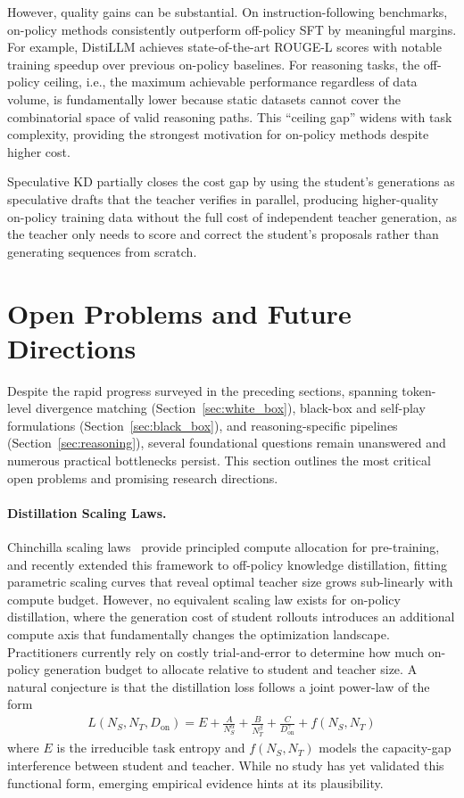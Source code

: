 \documentclass{article} %
\begin{document}
However, quality gains can be substantial. On instruction-following benchmarks, on-policy methods consistently outperform off-policy SFT by meaningful margins. For example, DistiLLM \citep{2402.03898} achieves state-of-the-art ROUGE-L scores with notable training speedup over previous on-policy baselines. For reasoning tasks, the off-policy ceiling, i.e., the maximum achievable performance regardless of data volume, is fundamentally lower because static datasets cannot cover the combinatorial space of valid reasoning paths. This ``ceiling gap'' widens with task complexity, providing the strongest motivation for on-policy methods despite higher cost.

Speculative KD \citep{2410.11325} partially closes the cost gap by using the student's generations as speculative drafts that the teacher verifies in parallel, producing higher-quality on-policy training data without the full cost of independent teacher generation, as the teacher only needs to score and correct the student's proposals rather than generating sequences from scratch.

\section{Open Problems and Future Directions}
\label{sec:future}

Despite the rapid progress surveyed in the preceding sections, spanning token-level divergence matching (Section~\ref{sec:white_box}), black-box and self-play formulations (Section~\ref{sec:black_box}), and reasoning-specific pipelines (Section~\ref{sec:reasoning}), several foundational questions remain unanswered and numerous practical bottlenecks persist. This section outlines the most critical open problems and promising research directions.

\paragraph{Distillation Scaling Laws.}
Chinchilla scaling laws~\citep{2203.15556} provide principled compute allocation for pre-training, and \citet{2502.08606} recently extended this framework to off-policy knowledge distillation, fitting parametric scaling curves that reveal optimal teacher size grows sub-linearly with compute budget. However, no equivalent scaling law exists for on-policy distillation, where the generation cost of student rollouts introduces an additional compute axis that fundamentally changes the optimization landscape. Practitioners currently rely on costly trial-and-error to determine how much on-policy generation budget to allocate relative to student and teacher size. A natural conjecture is that the distillation loss follows a joint power-law of the form
\begin{align}
L(N_S, N_T, D_{\text{on}}) = E + \frac{A}{N_S^\alpha} + \frac{B}{N_T^\beta} + \frac{C}{D_{\text{on}}^\gamma} + f(N_S, N_T) \label{eq:scaling}
\end{align}
where $E$ is the irreducible task entropy and $f(N_S, N_T)$ models the capacity-gap interference between student and teacher. While no study has yet validated this functional form, emerging empirical evidence hints at its plausibility.
\end{document}
